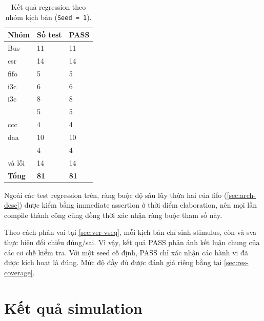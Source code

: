 \begin{table}[!htbp]
	\centering
	\caption{Kết quả regression theo nhóm kịch bản (\texttt{Seed = 1}).}
	\label{tab:res-regression}
	\begin{tabular}{L{5.0cm} C{4.0cm} C{4.0cm}}
		\toprule
		\textbf{Nhóm}                & \textbf{Số test} & \textbf{PASS} \\
		\midrule
		Bus                          & 11               & 11            \\
		\gls{csr}                    & 14               & 14            \\
		\gls{fifo}                   & 5                & 5             \\
		\gls{i3c} \PrivateWrite{}    & 6                & 6             \\
		\gls{i3c} \PrivateRead{}     & 8                & 8             \\
		\ImmediateDataTransfer{}     & 5                & 5             \\
		\gls{ccc}                    & 4                & 4             \\
		\gls{daa}                    & 10               & 10            \\
		\LegacyIic{}                 & 4                & 4             \\
		\ResponseDescriptor{} và lỗi & 14               & 14            \\
		\midrule
		\textbf{Tổng}                & \textbf{81}      & \textbf{81}   \\
		\bottomrule
	\end{tabular}
\end{table}

Ngoài các test regression trên, ràng buộc độ sâu lũy thừa hai của \gls{fifo}
(\cref{sec:arch-desc}) được kiểm bằng immediate assertion ở thời điểm elaboration, nên mọi lần
compile thành công cũng đồng thời xác nhận ràng buộc tham số này.

Theo cách phân vai tại \cref{sec:ver-vseq}, mỗi kịch bản chỉ sinh stimulus, còn \Scoreboard{} và
\Gls{sva} thực hiện đối chiếu đúng/sai. Vì vậy, kết quả PASS phản ánh kết luận chung của các cơ chế kiểm
tra. Với một seed cố định, PASS chỉ xác nhận các hành vi đã
được kích hoạt là đúng. Mức độ đầy đủ được đánh giá riêng bằng \FunctionalCoverage{} tại
\cref{sec:res-coverage}.

\section{Kết quả simulation}
\label{sec:res-waveform}

